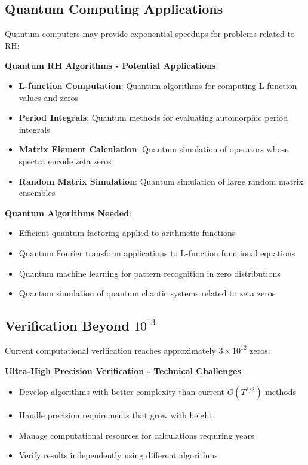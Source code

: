 \subsection{Quantum Computing Applications}
\label{subsec:quantum_computing}

Quantum computers may provide exponential speedups for problems related to RH:

\noindent\textbf{Quantum RH Algorithms - Potential Applications}:
\begin{itemize}
\item \textbf{L-function Computation}: Quantum algorithms for computing L-function values and zeros
\item \textbf{Period Integrals}: Quantum methods for evaluating automorphic period integrals
\item \textbf{Matrix Element Calculation}: Quantum simulation of operators whose spectra encode zeta zeros
\item \textbf{Random Matrix Simulation}: Quantum simulation of large random matrix ensembles
\end{itemize}

\textbf{Quantum Algorithms Needed}:
\begin{itemize}
\item Efficient quantum factoring applied to arithmetic functions
\item Quantum Fourier transform applications to L-function functional equations
\item Quantum machine learning for pattern recognition in zero distributions
\item Quantum simulation of quantum chaotic systems related to zeta zeros
\end{itemize}

\subsection{Verification Beyond $10^{13}$}
\label{subsec:verification_beyond}

Current computational verification reaches approximately $3 \times 10^{12}$ zeros:

\noindent\textbf{Ultra-High Precision Verification - Technical Challenges}:
\begin{itemize}
\item Develop algorithms with better complexity than current $O(T^{3/2})$ methods
\item Handle precision requirements that grow with height
\item Manage computational resources for calculations requiring years
\item Verify results independently using different algorithms
\end{itemize}

